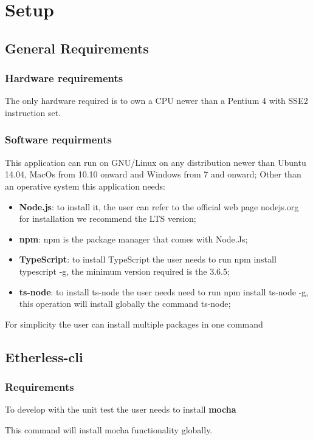 \section{Setup}
\subsection{General Requirements}
\subsubsection{Hardware requirements}
The only hardware required is to own a CPU newer than a Pentium 4 with SSE2 instruction set.
\subsubsection{Software requirments}
This application can run on GNU/Linux on any distribution newer than Ubuntu 14.04, MacOs from 10.10 onward and Windows from 7 and onward;
Other than an operative system this application needs:
\begin{itemize}
    \item \textbf{Node.js}: to install it, the user can refer to the official web page nodejs.org for installation we recommend the LTS version;
    \item \textbf{npm}: npm is the package manager that comes with Node.Js;
    \item \textbf{TypeScript}: to install TypeScript the user needs to run npm install typescript -g, the minimum version required is the 3.6.5;
    \item \textbf{ts-node}: to install ts-node the user needs need to run npm install ts-node -g, this operation will install globally the command ts-node;
\end{itemize}

For simplicity the user can install multiple packages in one command

\begin{center}
\end{center}

\subsection{Etherless-cli}
\subsubsection{Requirements}
To develop with the unit test the user needs to install \textbf{mocha}
\begin{center}
\end{center}
This command will install mocha functionality globally.

